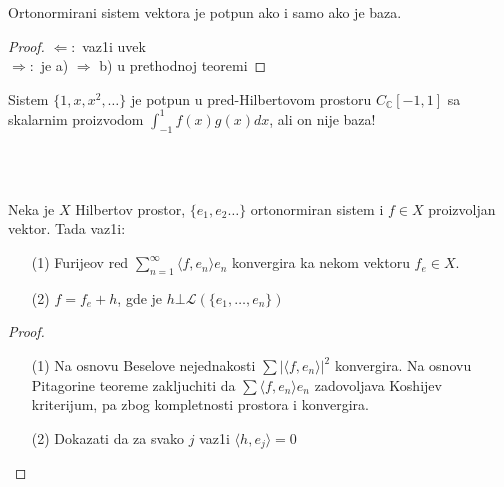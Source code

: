 \documentclass[a4paper,12pt]{article}
\newcommand{\CC}{\mathbb{C}}
\begin{document}
\begin{posl}
Ortonormirani sistem vektora je potpun ako i samo ako je baza.
\end{posl}
\begin{proof}
$\boxed{\Leftarrow}:$ vaz1i uvek \\
$\boxed{\Rightarrow}:$ je a) $\Longrightarrow$ b) u prethodnoj teoremi
\end{proof}

\begin{pr}
Sistem $\{1,x,x^2, \dots \}$ je potpun u pred-Hilbertovom prostoru $C_{\CC}[-1,1]$ sa ska\-larnim proizvodom $\int_{-1}^1 f(x) g(x) dx$, ali on nije baza!
\end{pr}
\\ \\
\begin{tma}
Neka je $X$ Hilbertov prostor, $\{e_1, e_2 \dots \}$ ortonormiran sistem i $f \in X$ proizvoljan vektor. Tada vaz1i:
\begin{itemize}
\item[(1)] Furijeov red $\sum_{n=1}^{\infty} \langle f, e_n \rangle e_n$ konvergira ka nekom vektoru $f_e \in X$.
\item[(2)] $f = f_e + h$, gde je $h \bot \mathcal{L}(\{e_1, \dots, e_n \})$
\end{itemize}
\end{tma}
\begin{proof}
\begin{itemize}
\item[(1)] Na osnovu Beselove nejednakosti $\sum {|\langle f, e_n \rangle |}^2$ konvergira. Na osnovu Pita\-go\-ri\-ne teoreme zakljuchiti da $\sum \langle f, e_n \rangle e_n $ zadovoljava Koshijev kriterijum, pa zbog kom\-ple\-tno\-sti prostora i konvergira.
\item[(2)] Dokazati da za svako $j$ vaz1i $\langle h, e_j \rangle = 0$
\end{itemize}
\end{proof}
\end{document}
